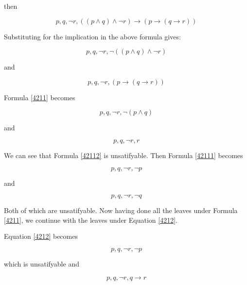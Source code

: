 \documentclass[10pt,a4paper]{article}
\begin{document}
then 

\begin{equation}
\label{421a}
p, q, \neg r, (( p \wedge q) \wedge \neg r) \rightarrow (p \rightarrow ( q \rightarrow r )) 
\end{equation}

Substituting for the implication in the above formula gives:

\begin{equation}
\label{4211}
p, q, \neg r, \neg (( p \wedge q) \wedge \neg r)
\end{equation}

and

\begin{equation}
\label{4212}
p, q, \neg r, (p \rightarrow ( q \rightarrow r )) 
\end{equation}


Formula \ref{4211} becomes 


\begin{equation}
\label{42111}
p, q, \neg r, \neg ( p \wedge q)
\end{equation}

and 

\begin{equation}
\label{42112}
p, q, \neg r, r
\end{equation}

We can see that Formula \ref{42112} is unsatifyable.  Then Formula \ref{42111} becomes

\begin{equation}
\label{421111}
p, q, \neg r, \neg p 
\end{equation}

and 

\begin{equation}
\label{421112}
p, q, \neg r, \neg q 
\end{equation}

Both of which are unsatifyable. Now having done all the leaves under Formula \ref{4211}, we continue with the leaves under Equation \ref{4212}.

Equation \ref{4212} becomes

\begin{equation}
\label{42121}
p, q, \neg r, \neg p 
\end{equation}

which is unsatifyable and
 
\begin{equation}
\label{42122}
p, q, \neg r, q \rightarrow r 
\end{equation} 
\end{document}
